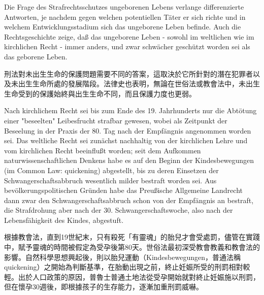 \documentclass[12pt]{article}
\begin{document}
\syncleft
\begin{sourcepara}
Die Frage des Strafrechtsschutzes ungeborenen Lebens verlange differenzierte Antworten, je nachdem gegen welchen potentiellen Täter er sich richte und in welchem Entwicklungsstadium sich das ungeborene Leben befinde. Auch die Rechtsgeschichte zeige, daß das ungeborene Leben - sowohl im weltlichen wie im kirchlichen Recht - immer anders, und zwar schwächer geschützt worden sei als das geborene Leben.
\end{sourcepara}
\begin{transpara}
刑法對未出生生命的保護問題需要不同的答案，這取決於它所針對的潛在犯罪者以及未出生生命所處的發展階段。法律史也表明，無論在世俗法或教會法中，未出生生命受到的保護始終與出生生命不同，而且保護力度也更弱。
\end{transpara}

\syncleft
\begin{sourcepara}
Nach kirchlichem Recht sei bis zum Ende des 19. Jahrhunderts nur die Abtötung einer "beseelten" Leibesfrucht strafbar gewesen, wobei als Zeitpunkt der Beseelung in der Praxis der 80. Tag nach der Empfängnis angenommen worden sei. Das weltliche Recht sei zunächst nachhaltig von der kirchlichen Lehre und vom kirchlichen Recht beeinflußt worden; seit dem Aufkommen naturwissenschaftlichen Denkens habe es auf den Beginn der Kindesbewegungen (im Common Law: quickening) abgestellt, bis zu deren Einsetzen der Schwangerschaftsabbruch wesentlich milder bestraft worden sei. Aus bevölkerungspolitischen Gründen habe das Preußische Allgemeine Landrecht dann zwar den Schwangerschaftsabbruch schon von der Empfängnis an bestraft, die Strafdrohung aber nach der 30. Schwangerschaftswoche, also nach der Lebensfähigkeit des Kindes, abgestuft.
\end{sourcepara}
\begin{transpara}
根據教會法，直到19世紀末，只有殺死「有靈魂」的胎兒才會受處罰，儘管在實踐中，賦予靈魂的時間被假定為受孕後第80天。世俗法最初深受教會教義和教會法的影響。自然科學思想興起後，則以胎兒運動（Kindesbewegungen，普通法稱 quickening）之開始為判斷基準，在胎動出現之前，終止妊娠所受的刑罰相對較輕。出於人口政策的原因，普魯士普通土地法從受孕開始就對終止妊娠施以刑罰，但在懷孕30週後，即根據孩子的生存能力，逐漸加重刑罰威嚇。
\end{transpara}
\end{document}
